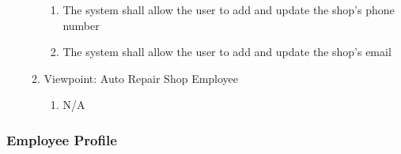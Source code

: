 \documentclass[12pt]{article}
\begin{document}
\begin{enumerate}[resume*=business_events]
\begin{enumerate}[VP\arabic*.]
\begin{enumerate}
			            \item The system shall allow the user to add and update the shop's phone number
			            \item The system shall allow the user to add and update the shop's email
		            \end{enumerate}
		      \item Viewpoint: Auto Repair Shop Employee
		            \begin{enumerate}
			            \item[] N/A
		            \end{enumerate}
	      \end{enumerate}
\end{enumerate}

\subsubsection{Employee Profile}
\end{document}
